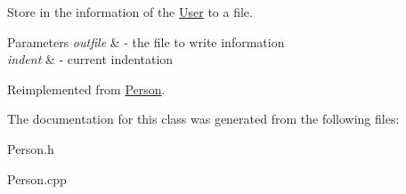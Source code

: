 Store in the information of the \mbox{\hyperlink{class_user}{User}} to a file. 


\begin{DoxyParams}{Parameters}
{\em outfile} & -\/ the file to write information \\
\hline
{\em indent} & -\/ current indentation \\
\hline
\end{DoxyParams}


Reimplemented from \mbox{\hyperlink{class_person_a80f87df3f644706c2ad8fc8b800fdd95}{Person}}.



The documentation for this class was generated from the following files\+:\begin{DoxyCompactItemize}
\item 
Person.\+h\item 
Person.\+cpp\end{DoxyCompactItemize}
